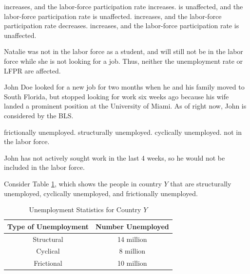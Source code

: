 \documentclass[addpoints,11pt]{exam}
\theoremstyle{definition}
\begin{document}
\begin{questions}
		
		\begin{choices}
			\choice increases, and the labor-force participation rate increases.
			\CorrectChoice is unaffected, and the labor-force participation rate is unaffected.
			\choice increases, and the labor-force participation rate decreases. 
			\choice increases, and the labor-force participation rate is unaffected.
		\end{choices}
		
		\begin{solution}
			Natalie was not in the labor force as a student, and will still not be in the labor force while she is not looking for a job. Thus, neither the unemployment rate or LFPR are affected.
		\end{solution}
	
	\question John Doe looked for a new job for two months when he and his family moved to South Florida, but stopped looking for work six weeks ago because his wife landed a prominent position at the University of Miami. As of right now, John is considered \underline{\hspace{3cm}} by the BLS.
	\begin{choices}
		\choice frictionally unemployed.
		\choice structurally unemployed. 
		\choice cyclically unemployed.
		\CorrectChoice not in the labor force.
	\end{choices}

	\begin{solution}
		John has not actively sought work in the last 4 weeks, so he would not be included in the labor force.
	\end{solution}

	\question Consider Table \ref{MC28}, which shows the people in country $Y$ that are structurally unemployed, cyclically unemployed, and frictionally unemployed. 
	
	
	\begin{table}[H]
		\caption{Unemployment Statistics for Country $Y$}
		\centering
		\begin{tabular}{  c | c} 
			
			Type of Unemployment & Number Unemployed\\
			\hline
			Structural &  14 million\\
			Cyclical &  8 million\\
			Frictional & 10 million\\
		\end{tabular}
		\label{MC28}
	\end{table}
	

\end{questions}
\end{document}

